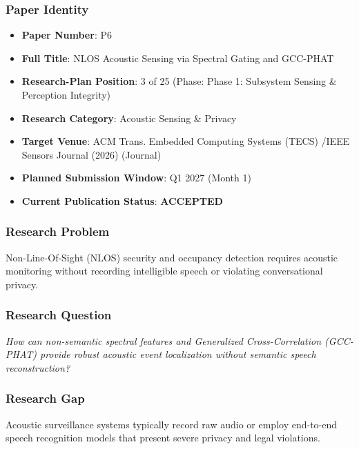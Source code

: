 \documentclass[11pt,letterpaper]{article}
\begin{document}
\subsubsection{Paper Identity}
\begin{itemize}[leftmargin=*]
    \item \textbf{Paper Number}: P6
    \item \textbf{Full Title}: NLOS Acoustic Sensing via Spectral Gating and GCC-\allowbreak PHAT
    \item \textbf{Research-Plan Position}: 3 of 25 (Phase: Phase 1: Subsystem Sensing \& Perception Integrity)
    \item \textbf{Research Category}: Acoustic Sensing \& Privacy
    \item \textbf{Target Venue}: ACM Trans. Embedded Computing Systems (TECS) /\allowbreak  IEEE Sensors Journal (2026) (Journal)
    \item \textbf{Planned Submission Window}: Q1 2027 (Month 1)
    \item \textbf{Current Publication Status}: \textbf{ACCEPTED}
\end{itemize}

\subsubsection{Research Problem}
Non-\allowbreak Line-\allowbreak Of-\allowbreak Sight (NLOS) security and occupancy detection requires acoustic monitoring without recording intelligible speech or violating conversational privacy.

\subsubsection{Research Question}
\begin{tcolorbox}[colback=blue!3!white,colframe=blue!50!black,title=Primary Scientific Question]
\textit{How can non-\allowbreak semantic spectral features and Generalized Cross-\allowbreak Correlation (GCC-\allowbreak PHAT) provide robust acoustic event localization without semantic speech reconstruction?}
\end{tcolorbox}

\subsubsection{Research Gap}
Acoustic surveillance systems typically record raw audio or employ end-\allowbreak to-\allowbreak end speech recognition models that present severe privacy and legal violations.
\end{document}
